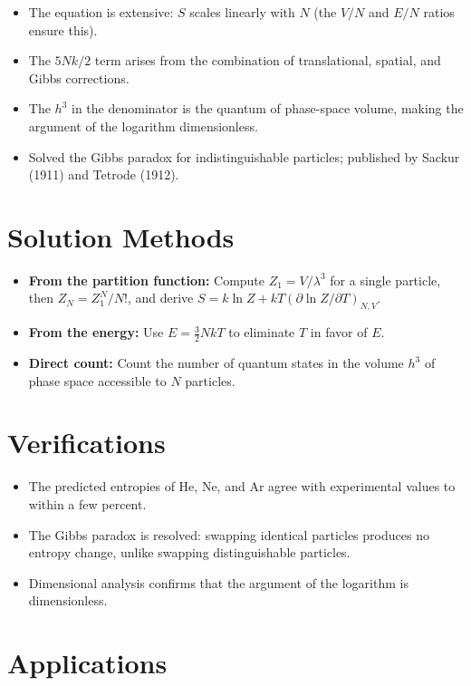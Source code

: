 \documentclass[11pt,openright]{book}
\begin{document}
\begin{itemize}
    \item The equation is extensive: $S$ scales linearly with $N$ (the $V/N$ and $E/N$ ratios ensure this).
    \item The $5Nk/2$ term arises from the combination of translational, spatial, and Gibbs corrections.
    \item The $h^3$ in the denominator is the quantum of phase-space volume, making the argument of the logarithm dimensionless.
    \item Solved the Gibbs paradox for indistinguishable particles; published by Sackur (1911) and Tetrode (1912).
\end{itemize}
\section*{Solution Methods}

\begin{itemize}
    \item \textbf{From the partition function:} Compute $Z_1 = V/\lambda^3$ for a single particle, then $Z_N = Z_1^N/N!$, and derive $S = k\ln Z + kT(\partial\ln Z/\partial T)_{N,V}$.
    \item \textbf{From the energy:} Use $E = \frac{3}{2}NkT$ to eliminate $T$ in favor of $E$.
    \item \textbf{Direct count:} Count the number of quantum states in the volume $h^3$ of phase space accessible to $N$ particles.
\end{itemize}
\section*{Verifications}

\begin{itemize}
    \item The predicted entropies of He, Ne, and Ar agree with experimental values to within a few percent.
    \item The Gibbs paradox is resolved: swapping identical particles produces no entropy change, unlike swapping distinguishable particles.
    \item Dimensional analysis confirms that the argument of the logarithm is dimensionless.
\end{itemize}
\section*{Applications}
\end{document}
